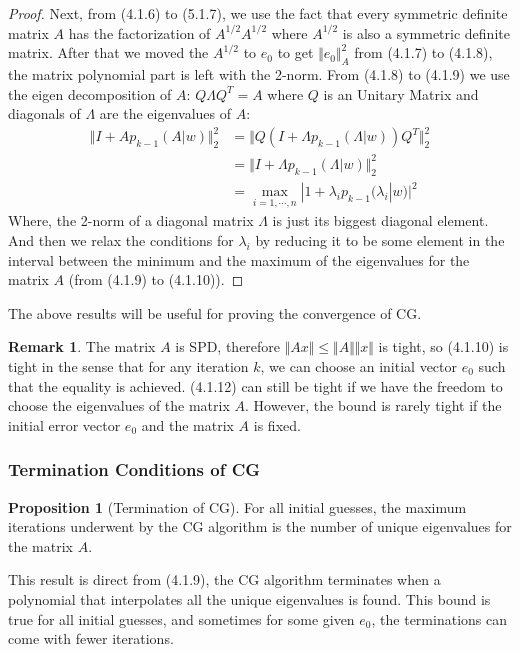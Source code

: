 \documentclass[]{article}
\theoremstyle{definition}
\newtheorem{prop}{Proposition}[section]  %
\newtheorem{remark}{Remark}[subsection]  %
\begin{document}
\begin{proof}
            \par
            Next, from (4.1.6) to (5.1.7), we use the fact that every symmetric definite matrix $A$ has the factorization of $A^{1/2}A^{1/2}$ where $A^{1/2}$ is also a symmetric definite matrix. After that we moved the $A^{1/2}$ to $e_0$ to get $\Vert e_0\Vert_A^2$ from (4.1.7) to (4.1.8), the matrix polynomial part is left with the 2-norm. From (4.1.8) to (4.1.9) we use the eigen decomposition of $A$: $Q\Lambda Q^T = A$ where $Q$ is an Unitary Matrix and diagonals of $\Lambda$ are the eigenvalues of $A$:
            \begin{align}
                \Vert I + Ap_{k - 1}(A|w)\Vert_2^2
                &= \Vert Q(I + \Lambda p_{k - 1}(\Lambda|w))Q^T\Vert_2^2
                \\
                &= \Vert I + \Lambda p_{k - 1}(\Lambda|w)\Vert_2^2
                \\
                &= \max_{i=1,\cdots, n}|1 + \lambda_ip_{k - 1}(\lambda_i|w)|^2
            \end{align}
            Where, the 2-norm of a diagonal matrix $\Lambda$ is just its biggest diagonal element. And then we relax the conditions for $\lambda_i$ by reducing it to be some element in the interval between the minimum and the maximum of the eigenvalues for the matrix $A$ (from (4.1.9) to (4.1.10)).
        \end{proof}
        The above results will be useful for proving the convergence of CG. 
        \begin{remark}
            The matrix $A$ is SPD, therefore $\Vert Ax\Vert \le \Vert A\Vert\Vert x\Vert$ is tight, so (4.1.10) is tight in the sense that for any iteration $k$, we can choose an initial vector $e_0$ such that the equality is achieved. (4.1.12) can still be tight if we have the freedom to choose the eigenvalues of the matrix $A$. However, the bound is rarely tight if the initial error vector $e_0$ and the matrix $A$ is fixed. 
        \end{remark}
        \subsubsection{Termination Conditions of CG}
            \begin{prop}[Termination of CG]\label{prop:Termination_of_CG}
                For all initial guesses, the maximum iterations underwent by the CG algorithm is the number of unique eigenvalues for the matrix $A$. 
            \end{prop}
            This result is direct from (4.1.9), the CG algorithm terminates when a polynomial that interpolates all the unique eigenvalues is found. This bound is true for all initial guesses, and sometimes for some given $e_0$, the terminations can come with fewer iterations. 
\end{document}
